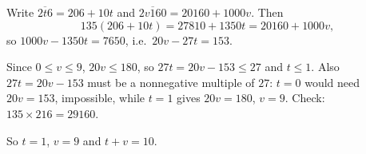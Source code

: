 Write $\overline{2t6}=206+10t$ and $\overline{2v160}=20160+1000v$. Then
\[
135(206+10t)=27810+1350t=20160+1000v,
\]
so $1000v-1350t=7650$, i.e.\ $20v-27t=153$.

Since $0\le v\le9$, $20v\le180$, so $27t=20v-153\le27$ and $t\le1$. Also $27t=20v-153$ must be a nonnegative multiple of $27$: $t=0$ would need $20v=153$, impossible, while $t=1$ gives $20v=180$, $v=9$. Check: $135\times216=29160$.

So $t=1$, $v=9$ and $t+v=\boxed{10}$.
